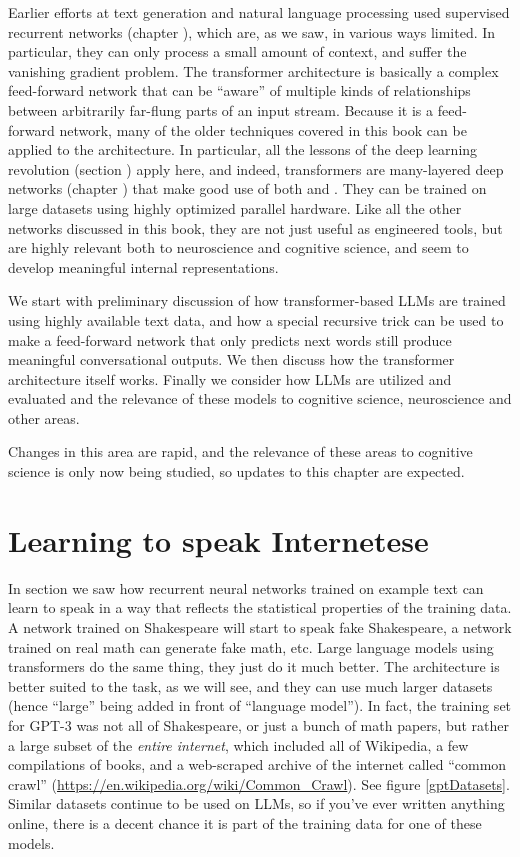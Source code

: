 Earlier efforts at text generation and natural language processing used supervised recurrent networks (chapter ), which are, as we saw, in various ways limited. In particular, they can only process a small amount of context, and suffer the vanishing gradient problem. The transformer architecture is basically a complex feed-forward network that can be ``aware'' of multiple kinds of relationships between arbitrarily far-flung parts of an input stream. Because it is a feed-forward network, many of the older techniques covered in this book can be applied to the architecture. In particular, all the lessons of the deep learning revolution (section ) apply here, and indeed, transformers are many-layered deep networks (chapter ) that make good use of both  and . They can be trained on large datasets using highly optimized parallel hardware. Like all the other networks discussed in this book, they are not just useful as engineered tools, but are highly relevant both to neuroscience and cognitive science, and seem to develop meaningful internal representations. 

We start with preliminary discussion of how transformer-based LLMs are trained using highly available text data, and how a special recursive trick can be used to make a feed-forward network that only predicts next words still produce meaningful conversational outputs. We then discuss how the transformer architecture itself works. Finally we consider how LLMs are utilized and evaluated and the relevance of these models to cognitive science, neuroscience and other areas.

Changes in this area are rapid, and the relevance of these areas to cognitive science is only now being studied, so updates to this chapter are expected.

\section{Learning to speak Internetese}

In section  we saw how recurrent neural networks trained on example text can learn to speak in a way that reflects the statistical properties of the training data. A network trained on Shakespeare will start to speak fake Shakespeare, a network trained on real math can generate fake math, etc. Large language models using transformers do the same thing, they just do it much better. The architecture is better suited to the task, as we will see, and they can use much larger datasets (hence ``large'' being added in front of ``language model''). In fact, the training set for GPT-3 was not all of Shakespeare, or just a bunch of math papers, but rather a large subset of the \emph{entire internet}, which included all of Wikipedia, a few compilations of books, and a web-scraped archive of the internet called ``common crawl'' (\url{https://en.wikipedia.org/wiki/Common_Crawl}). See figure \ref{gptDatasets}. Similar datasets continue to be used on LLMs, so if you've ever written anything online, there is a decent chance it is part of the training data for one of these models. 

